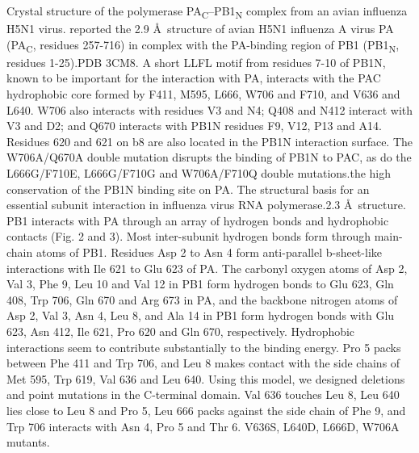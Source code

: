 \citep{1540} Crystal structure of the polymerase PA\textsubscript{C}–PB1\textsubscript{N} complex from an avian influenza H5N1 virus. reported the 2.9 \AA\ structure of avian H5N1 influenza A virus PA (PA\textsubscript{C}, residues 257-716) in complex with the PA-binding region of PB1 (PB1\textsubscript{N}, residues 1-25).PDB 3CM8. A short LLFL motif from residues 7-10 of PB1N, known to be important for the interaction with PA, interacts with the PAC hydrophobic core formed by F411, M595, L666, W706 and F710, and V636 and L640. W706 also interacts with residues V3 and N4; Q408 and N412 interact with V3 and D2; and Q670 interacts with PB1N residues F9, V12, P13 and A14. Residues 620 and 621 on b8 are also located in the PB1N interaction surface. The W706A/Q670A double mutation disrupts the binding of PB1N to PAC, as do the L666G/F710E, L666G/F710G and W706A/F710Q double mutations.the high conservation of the PB1N binding site on PA.%
\citep{1141} The structural basis for an essential subunit interaction in influenza virus RNA polymerase.2.3 \AA\ structure. PB1 interacts with PA through an array of hydrogen bonds and hydrophobic contacts (Fig. 2 and 3). Most inter-subunit hydrogen bonds form through main-chain atoms of PB1. Residues Asp 2 to Asn 4 form anti-parallel b-sheet-like interactions with Ile 621 to Glu 623 of PA. The carbonyl oxygen atoms of Asp 2, Val 3, Phe 9, Leu 10 and Val 12 in PB1 form hydrogen bonds to Glu 623, Gln 408, Trp 706, Gln 670 and Arg 673 in PA, and the backbone nitrogen atoms of Asp 2, Val 3, Asn 4, Leu 8, and Ala 14 in PB1 form hydrogen bonds with Glu 623, Asn 412, Ile 621, Pro 620 and Gln 670, respectively. Hydrophobic interactions seem to contribute substantially to the binding energy. Pro 5 packs between Phe 411 and Trp 706, and Leu 8 makes contact with the side chains of Met 595, Trp 619, Val 636 and Leu 640. Using this model, we designed deletions and point mutations in the C-terminal domain. Val 636 touches Leu 8, Leu 640 lies close to Leu 8 and Pro 5, Leu 666 packs against the side chain of Phe 9, and Trp 706 interacts with Asn 4, Pro 5 and Thr 6. V636S, L640D, L666D, W706A mutants.%

